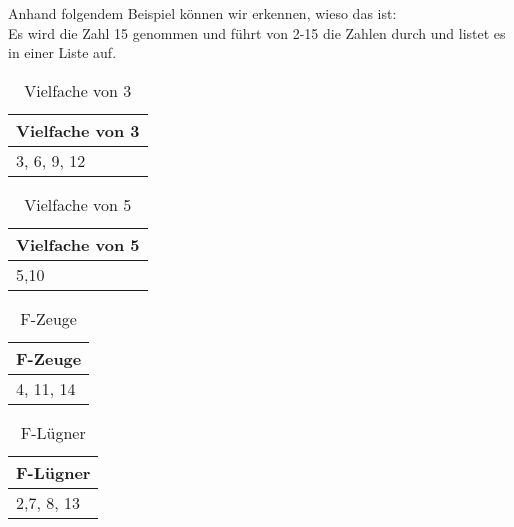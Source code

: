 Anhand folgendem Beispiel können wir erkennen, wieso das ist:
\\
Es wird die Zahl 15 genommen und führt von 2-15 die Zahlen durch und listet es in einer Liste auf.\\
\begin{table}[!ht]
    \centering
        \begin{tabular}{l}
            \toprule
            \textbf{Vielfache von 3}\\
            \midrule
            3, 6, 9, 12\\
           \bottomrule
        \end{tabular}
        \caption{Vielfache von 3}
        \label{tab3}
    \end{table}

    \begin{table}[!ht]
        \centering
            \begin{tabular}{l}
                \toprule
                \textbf{Vielfache von 5}\\
                \midrule
                5,10\\
               \bottomrule
            \end{tabular}
            \caption{Vielfache von 5}
            \label{tab3}
        \end{table}

        \begin{table}[!ht]
            \centering
                \begin{tabular}{l}
                    \toprule
                    \textbf{F-Zeuge}\\
                    \midrule
                    4, 11, 14\\
                   \bottomrule
                \end{tabular}
                \caption{F-Zeuge}
                \label{tab3}
            \end{table}

            \begin{table}[!ht]
                \centering
                    \begin{tabular}{l}
                        \toprule
                        \textbf{F-Lügner}\\
                        \midrule
                        2,7, 8, 13 \\
                       \bottomrule
                    \end{tabular}
                    \caption{F-Lügner}
                    \label{tab3}
                \end{table}


